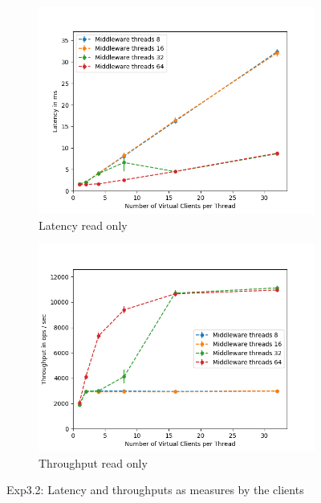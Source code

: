 \documentclass[11pt,a4paper]{article}
\begin{document}

\begin{figure}[H]
\centering
\begin{subfigure}{.5\textwidth}
    \centering
    \includegraphics[width=\textwidth]{img/exp3_2/exp3_2__latency_client_write_0.png}
    \caption{Latency read only}
    \label{fig:mesh1}
\end{subfigure}%
\begin{subfigure}{.5\textwidth}
      \centering
    \includegraphics[width=\textwidth]{img/exp3_2/exp3_2__throughput_client_write_0.png}
    \caption{Throughput read only}
    \label{fig:mesh1}
\end{subfigure}
\caption{Exp3.2: Latency and throughputs as measures by the clients}
\label{fig:test}
\end{figure}
\end{document}
